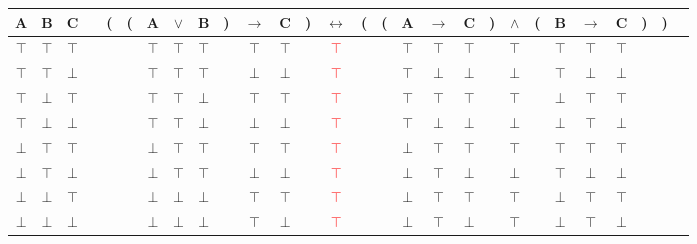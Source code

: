 \documentclass[article,reqno,times,12pt,french]{smfart}
\begin{document}
\begin{tabular}{@{ }c@{ }@{ }c@{ }@{ }c | c@{ }@{}c@{}@{}c@{}@{ }c@{ }@{ }c@{ }@{ }c@{ }@{}c@{}@{ }c@{ }@{ }c@{ }@{}c@{}@{ }c@{ }@{}c@{}@{}c@{}@{ }c@{ }@{ }c@{ }@{ }c@{ }@{}c@{}@{ }c@{ }@{}c@{}@{ }c@{ }@{ }c@{ }@{ }c@{ }@{}c@{}@{}c@{}@{ }c}
A & B & C &  & ( & ( & A & $\lor$ & B & ) & $\rightarrow$ & C & ) & $\leftrightarrow$ & ( & ( & A & $\rightarrow$ & C & ) & $\land$ & ( & B & $\rightarrow$ & C & ) & ) & \\
\hline 
$\top$ & $\top$ & $\top$ &  &  &  & $\top$ & $\top$ & $\top$ &  & $\top$ & $\top$ &  & \textcolor{red}{$\top$} &  &  & $\top$ & $\top$ & $\top$ &  & $\top$ &  & $\top$ & $\top$ & $\top$ &  &  & \\
$\top$ & $\top$ & $\bot$ &  &  &  & $\top$ & $\top$ & $\top$ &  & $\bot$ & $\bot$ &  & \textcolor{red}{$\top$} &  &  & $\top$ & $\bot$ & $\bot$ &  & $\bot$ &  & $\top$ & $\bot$ & $\bot$ &  &  & \\
$\top$ & $\bot$ & $\top$ &  &  &  & $\top$ & $\top$ & $\bot$ &  & $\top$ & $\top$ &  & \textcolor{red}{$\top$} &  &  & $\top$ & $\top$ & $\top$ &  & $\top$ &  & $\bot$ & $\top$ & $\top$ &  &  & \\
$\top$ & $\bot$ & $\bot$ &  &  &  & $\top$ & $\top$ & $\bot$ &  & $\bot$ & $\bot$ &  & \textcolor{red}{$\top$} &  &  & $\top$ & $\bot$ & $\bot$ &  & $\bot$ &  & $\bot$ & $\top$ & $\bot$ &  &  & \\
$\bot$ & $\top$ & $\top$ &  &  &  & $\bot$ & $\top$ & $\top$ &  & $\top$ & $\top$ &  & \textcolor{red}{$\top$} &  &  & $\bot$ & $\top$ & $\top$ &  & $\top$ &  & $\top$ & $\top$ & $\top$ &  &  & \\
$\bot$ & $\top$ & $\bot$ &  &  &  & $\bot$ & $\top$ & $\top$ &  & $\bot$ & $\bot$ &  & \textcolor{red}{$\top$} &  &  & $\bot$ & $\top$ & $\bot$ &  & $\bot$ &  & $\top$ & $\bot$ & $\bot$ &  &  & \\
$\bot$ & $\bot$ & $\top$ &  &  &  & $\bot$ & $\bot$ & $\bot$ &  & $\top$ & $\top$ &  & \textcolor{red}{$\top$} &  &  & $\bot$ & $\top$ & $\top$ &  & $\top$ &  & $\bot$ & $\top$ & $\top$ &  &  & \\
$\bot$ & $\bot$ & $\bot$ &  &  &  & $\bot$ & $\bot$ & $\bot$ &  & $\top$ & $\bot$ &  & \textcolor{red}{$\top$} &  &  & $\bot$ & $\top$ & $\bot$ &  & $\top$ &  & $\bot$ & $\top$ & $\bot$ &  &  & \\
\end{tabular}
\end{document}
